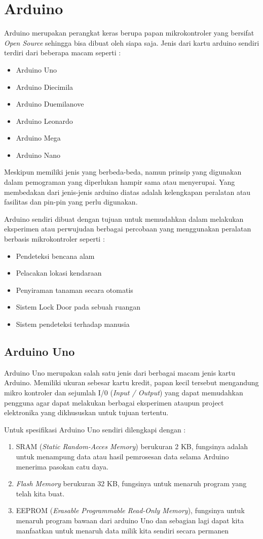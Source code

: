 \section{Arduino}
Arduino merupakan perangkat keras berupa papan mikrokontroler yang bersifat \textit{Open Source} sehingga bisa dibuat oleh siapa saja. 
Jenis dari kartu arduino sendiri terdiri dari beberapa macam seperti :
\begin{itemize}
\item Arduino Uno 
\item Arduino Diecimila
\item Arduino Duemilanove
\item Arduino Leonardo
\item Arduino Mega
\item Arduino Nano
\end{itemize}
Meskipun memiliki jenis yang berbeda-beda, namun prinsip yang digunakan dalam pemograman yang diperlukan hampir sama atau menyerupai. Yang membedakan dari jenis-jenis arduino diatas adalah kelengkapan peralatan atau fasilitas dan pin-pin yang perlu digunakan. 

Arduino sendiri dibuat dengan tujuan untuk memudahkan dalam melakukan eksperimen atau perwujudan berbagai percobaan yang menggunakan peralatan berbasis mikrokontroler seperti :
\begin{itemize}
\item Pendeteksi bencana alam
\item Pelacakan lokasi kendaraan
\item Penyiraman tanaman secara otomatis
\item Sistem Lock Door pada sebuah ruangan
\item Sistem pendeteksi terhadap manusia
\end{itemize}
\subsection{Arduino Uno}
Arduino Uno merupakan salah satu jenis dari berbagai macam jenis kartu Arduino. Memiliki ukuran sebesar kartu kredit, papan kecil tersebut mengandung mikro kontroler dan sejumlah I/0 (\textit{Input / Output}) yang dapat memudahkan pengguna agar dapat melakukan berbagai eksperimen ataupun project elektronika yang dikhususkan untuk tujuan tertentu.

Untuk spesifikasi Arduino Uno sendiri dilengkapi dengan :
\begin{enumerate}
\item SRAM (\textit{Static Random-Acces Memory}) berukuran 2 KB, fungsinya adalah untuk menampung data atau hasil pemrosesan data selama Arduino menerima pasokan catu daya.
\item \textit{Flash Memory} berukuran 32 KB, fungsinya untuk menaruh program yang telah kita buat.
\item EEPROM  (\textit{Erasable Programmable Read-Only Memory}), fungsinya untuk menaruh program bawaan dari arduino Uno dan sebagian lagi dapat kita manfaatkan untuk menaruh data milik kita sendiri secara permanen
\end{enumerate}

